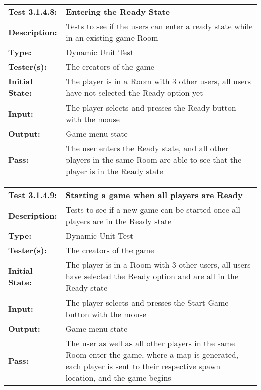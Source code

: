 \documentclass[12pt, titlepage]{article}
\begin{document}
\begin{mdframed}[linewidth=1pt]
\begin{tabularx}{\textwidth}{@{}p{3cm}X@{}}
{\bf Test 3.1.4.8:} & {\bf Entering the Ready State}\\[\baselineskip]
{\bf Description:} & Tests to see if the users can enter a ready state while in an existing game Room\\[0.5\baselineskip]
{\bf Type:} & Dynamic Unit Test\\[0.5\baselineskip]
{\bf Tester(s):} & The creators of the game\\[0.5\baselineskip]
{\bf Initial State:} & The player is in a Room with 3 other users, all users have not selected the Ready option yet\\[0.5\baselineskip]
{\bf Input:} & The player selects and presses the Ready button with the mouse \\[0.5\baselineskip]
{\bf Output:} & Game menu state\\[0.5\baselineskip]
{\bf Pass:} & The user enters the Ready state, and all other players in the same Room are able to see that the player is in the Ready state
\end{tabularx}
\end{mdframed}

\begin{mdframed}[linewidth=1pt]
\begin{tabularx}{\textwidth}{@{}p{3cm}X@{}}
{\bf Test 3.1.4.9:} & {\bf Starting a game when all players are Ready}\\[\baselineskip]
{\bf Description:} & Tests to see if a new game can be started once all players are in the Ready state\\[0.5\baselineskip]
{\bf Type:} & Dynamic Unit Test\\[0.5\baselineskip]
{\bf Tester(s):} & The creators of the game\\[0.5\baselineskip]
{\bf Initial State:} & The player is in a Room with 3 other users, all users have selected the Ready option and are all in the Ready state\\[0.5\baselineskip]
{\bf Input:} & The player selects and presses the Start Game button with the mouse \\[0.5\baselineskip]
{\bf Output:} & Game menu state\\[0.5\baselineskip]
{\bf Pass:} & The user as well as all other players in the same Room enter the game, where a map is generated, each player is sent to their respective spawn location, and the game begins
\end{tabularx}
\end{mdframed}
\end{document}
